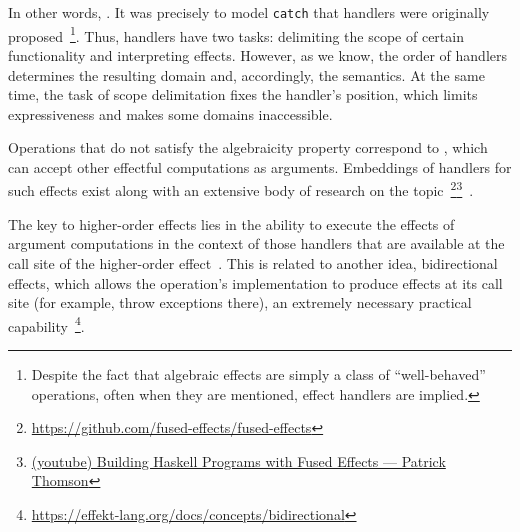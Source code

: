 In other words, .
It was precisely to model \texttt{catch} that handlers were originally proposed~\cite{plotkin2013handling}\footnote{Despite the fact that algebraic effects are simply a class of ``well-behaved'' operations, often when they are mentioned, effect handlers are implied.}.
Thus, handlers have two tasks: delimiting the scope of certain functionality and interpreting effects.
However, as we know, the order of handlers determines the resulting domain and, accordingly, the semantics.
At the same time, the task of scope delimitation fixes the handler's position, which limits expressiveness and makes some domains inaccessible.

Operations that do not satisfy the algebraicity property correspond to , which can accept other effectful computations as arguments.
Embeddings of handlers for such effects exist along with an extensive body of research on the topic~\cite{wu2014effect}\footnote{\url{https://github.com/fused-effects/fused-effects}}\footnote{\href{https://youtu.be/vfDazZfxlNs?si=3o1zkoL8GsmezMtU}{(youtube) Building Haskell Programs with Fused Effects --- Patrick Thomson}}~\cite{yang2022structured}.

The key to higher-order effects lies in the ability to execute the effects of argument computations in the context of those handlers that are available at the call site of the higher-order effect~\cite{van2022handling}.
This is related to another idea, bidirectional effects, which allows the operation's implementation to produce effects at its call site (for example, throw exceptions there), an extremely necessary practical capability~\cite{zhang2020handling}\footnote{\url{https://effekt-lang.org/docs/concepts/bidirectional}}.


%
%



